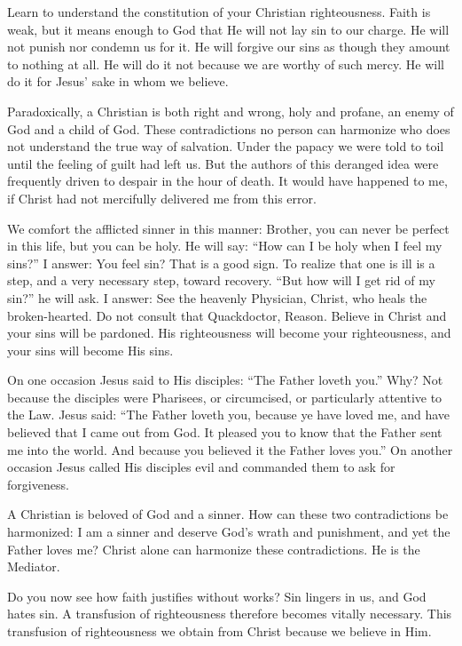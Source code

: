 Learn to understand the constitution of your Christian righteousness. Faith is weak, but it means enough to God that He will not lay sin to our charge. He will not punish nor condemn us for it. He will forgive our sins as though they amount to nothing at all. He will do it not because we are worthy of such mercy. He will do it for Jesus’ sake in whom we believe.

Paradoxically, a Christian is both right and wrong, holy and profane, an enemy of God and a child of God. These contradictions no person can harmonize who does not understand the true way of salvation. Under the papacy we were told to toil until the feeling of guilt had left us. But the authors of this deranged idea were frequently driven to despair in the hour of death. It would have happened to me, if Christ had not mercifully delivered me from this error.

We comfort the afflicted sinner in this manner: Brother, you can never be perfect in this life, but you can be holy. He will say: “How can I be holy when I feel my sins?” I answer: You feel sin? That is a good sign. To realize that one is ill is a step, and a very necessary step, toward recovery. “But how will I get rid of my sin?” he will ask. I answer: See the heavenly Physician, Christ, who heals the broken-hearted. Do not consult that Quackdoctor, Reason. Believe in Christ and your sins will be pardoned. His righteousness will become your righteousness, and your sins will become His sins.

On one occasion Jesus said to His disciples: “The Father loveth you.” Why? Not because the disciples were Pharisees, or circumcised, or particularly attentive to the Law. Jesus said: “The Father loveth you, because ye have loved me, and have believed that I came out from God. It pleased you to know that the Father sent me into the world. And because you believed it the Father loves you.” On another occasion Jesus called His disciples evil and commanded them to ask for forgiveness.

A Christian is beloved of God and a sinner. How can these two contradictions be harmonized: I am a sinner and deserve God’s wrath and punishment, and yet the Father loves me? Christ alone can harmonize these contradictions. He is the Mediator.

Do you now see how faith justifies without works? Sin lingers in us, and God hates sin. A transfusion of righteousness therefore becomes vitally necessary. This transfusion of righteousness we obtain from Christ because we believe in Him.

